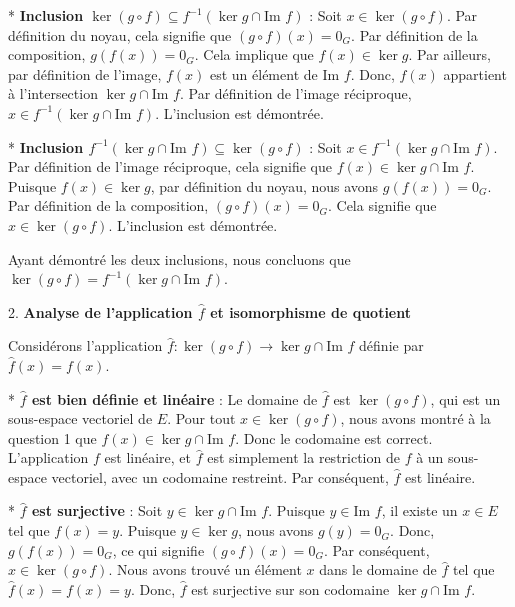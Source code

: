 \documentclass{report}
\begin{document}
    *   \textbf{Inclusion $\ker(g \circ f) \subseteq f^{-1}(\ker g \cap \text{Im } f)$} :
        Soit $x \in \ker(g \circ f)$. Par définition du noyau, cela signifie que $(g \circ f)(x) = 0_G$.
        Par définition de la composition, $g(f(x)) = 0_G$.
        Cela implique que $f(x) \in \ker g$.
        Par ailleurs, par définition de l'image, $f(x)$ est un élément de $\text{Im } f$.
        Donc, $f(x)$ appartient à l'intersection $\ker g \cap \text{Im } f$.
        Par définition de l'image réciproque, $x \in f^{-1}(\ker g \cap \text{Im } f)$.
        L'inclusion est démontrée.

    *   \textbf{Inclusion $f^{-1}(\ker g \cap \text{Im } f) \subseteq \ker(g \circ f)$} :
        Soit $x \in f^{-1}(\ker g \cap \text{Im } f)$. Par définition de l'image réciproque, cela signifie que $f(x) \in \ker g \cap \text{Im } f$.
        Puisque $f(x) \in \ker g$, par définition du noyau, nous avons $g(f(x)) = 0_G$.
        Par définition de la composition, $(g \circ f)(x) = 0_G$.
        Cela signifie que $x \in \ker(g \circ f)$.
        L'inclusion est démontrée.

    Ayant démontré les deux inclusions, nous concluons que $\ker(g \circ f) = f^{-1}(\ker g \cap \text{Im } f)$.

2.  \textbf{Analyse de l'application $\hat{f}$ et isomorphisme de quotient}

    Considérons l'application $\hat{f}: \ker(g \circ f) \to \ker g \cap \text{Im } f$ définie par $\hat{f}(x) = f(x)$.

    *   \textbf{$\hat{f}$ est bien définie et linéaire} :
        Le domaine de $\hat{f}$ est $\ker(g \circ f)$, qui est un sous-espace vectoriel de $E$.
        Pour tout $x \in \ker(g \circ f)$, nous avons montré à la question 1 que $f(x) \in \ker g \cap \text{Im } f$. Donc le codomaine est correct.
        L'application $f$ est linéaire, et $\hat{f}$ est simplement la restriction de $f$ à un sous-espace vectoriel, avec un codomaine restreint. Par conséquent, $\hat{f}$ est linéaire.

    *   \textbf{$\hat{f}$ est surjective} :
        Soit $y \in \ker g \cap \text{Im } f$. Puisque $y \in \text{Im } f$, il existe un $x \in E$ tel que $f(x) = y$.
        Puisque $y \in \ker g$, nous avons $g(y) = 0_G$.
        Donc, $g(f(x)) = 0_G$, ce qui signifie $(g \circ f)(x) = 0_G$.
        Par conséquent, $x \in \ker(g \circ f)$.
        Nous avons trouvé un élément $x$ dans le domaine de $\hat{f}$ tel que $\hat{f}(x) = f(x) = y$.
        Donc, $\hat{f}$ est surjective sur son codomaine $\ker g \cap \text{Im } f$.
\end{document}
